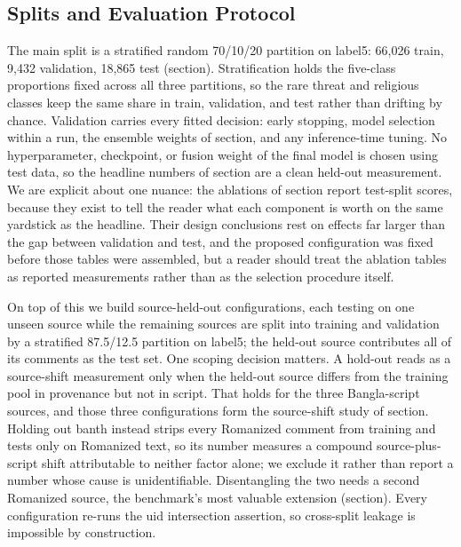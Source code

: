 \documentclass[11pt,a4paper]{article}
\def\dset#1{#1}%
\def\cref#1{section}%
\def\texttt#1{#1}%
\def\textsc#1{#1}%
\def\emph#1{#1}%
\providecommand{\dset}[1]{\textsc{#1}}
\begin{document}
\subsection{Splits and Evaluation Protocol}
\label{sec:splits}

The main split is a stratified random 70/10/20 partition on \texttt{label5}: 66{,}026 train, 9{,}432 validation, 18{,}865 test (\cref{tab:split}). Stratification holds the five-class proportions fixed across all three partitions, so the rare \emph{threat} and \emph{religious} classes keep the same share in train, validation, and test rather than drifting by chance. Validation carries every fitted decision: early stopping, model selection within a run, the ensemble weights of \cref{eq:weightopt}, and any inference-time tuning. No hyperparameter, checkpoint, or fusion weight of the final model is chosen using test data, so the headline numbers of \cref{sec:main-results} are a clean held-out measurement. We are explicit about one nuance: the ablations of \cref{sec:ablation-results,sec:scriptmask-results} report test-split scores, because they exist to tell the reader what each component is worth on the same yardstick as the headline. Their design conclusions rest on effects far larger than the gap between validation and test, and the proposed configuration was fixed before those tables were assembled, but a reader should treat the ablation tables as reported measurements rather than as the selection procedure itself.

On top of this we build \emph{source-held-out} configurations, each testing on one unseen source while the remaining sources are split into training and validation by a stratified 87.5/12.5 partition on \texttt{label5}; the held-out source contributes all of its comments as the test set. One scoping decision matters. A hold-out reads as a \emph{source-shift} measurement only when the held-out source differs from the training pool in provenance but not in script. That holds for the three Bangla-script sources, and those three configurations form the source-shift study of \cref{sec:robustness-results}. Holding out \dset{banth} instead strips every Romanized comment from training and tests only on Romanized text, so its number measures a compound source-plus-script shift attributable to neither factor alone; we exclude it rather than report a number whose cause is unidentifiable. Disentangling the two needs a second Romanized source, the benchmark's most valuable extension (\cref{sec:limitations}). Every configuration re-runs the \texttt{uid} intersection assertion, so cross-split leakage is impossible by construction.
\end{document}
